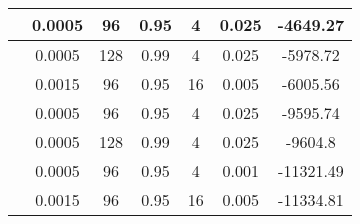 \begin{minipage}[t][0.45\textheight][t]{\textwidth}
{\begin{tabular}{|c|c|c|c|c|c|c|}
        \hline
        [32:64] & 0.0005 & 96 & 0.95 & 4 & 0.025 & -4649.27 \\
        \hline
        [32:32:128] & 0.0005 & 128 & 0.99 & 4 & 0.025 & -5978.72 \\
        \hline
        [32:64] & 0.0015 & 96 & 0.95 & 16 & 0.005 & -6005.56 \\
        \hline
        [256:128:256] & 0.0005 & 96 & 0.95 & 4 & 0.025 & -9595.74 \\
        \hline
        [256:128:256] & 0.0005 & 128 & 0.99 & 4 & 0.025 & -9604.8 \\
        \hline
        [256:128:256] & 0.0005 & 96 & 0.95 & 4 & 0.001 & -11321.49 \\
        \hline
        [256:128:256] & 0.0015 & 96 & 0.95 & 16 & 0.005 & -11334.81 \\
        \hline
    \end{tabular}
    }
\end{minipage}
